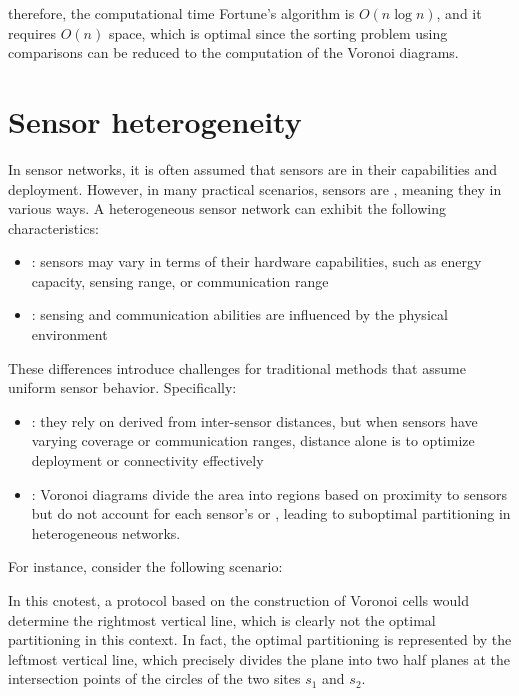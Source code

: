 \documentclass[a4paper, 12pt]{report}
\begin{document}
    therefore, the computational time Fortune's algorithm is $O(n \log n)$, and it requires $O(n)$ space, which is optimal since the sorting problem using comparisons can be reduced to the computation of the Voronoi diagrams.

    \section{Sensor heterogeneity}

    In sensor networks, it is often assumed that sensors are  in their capabilities and deployment. However, in many practical scenarios, sensors are , meaning they  in various ways. A heterogeneous sensor network can exhibit the following characteristics:

    \begin{itemize}
        \item {}: sensors may vary in terms of their hardware capabilities, such as energy capacity, sensing range, or communication range
        \item {}: sensing and communication abilities are influenced by the physical environment
    \end{itemize}

    These differences introduce challenges for traditional methods that assume uniform sensor behavior. Specifically:

    \begin{itemize}
        \item {}: they rely on  derived from inter-sensor distances, but when sensors have varying coverage or communication ranges, distance alone is  to optimize deployment or connectivity effectively
        \item {}: Voronoi diagrams divide the area into regions based on proximity to sensors but do not account for each sensor's  or , leading to suboptimal partitioning in heterogeneous networks.
    \end{itemize}

    For instance, consider the following scenario:


    In this cnotest, a protocol based on the construction of Voronoi cells would determine the rightmost vertical line, which is clearly not the optimal partitioning in this context. In fact, the optimal partitioning is represented by the leftmost vertical line, which precisely divides the plane into two half planes at the intersection points of the circles of the two sites $s_1$ and $s_2$.
\end{document}
